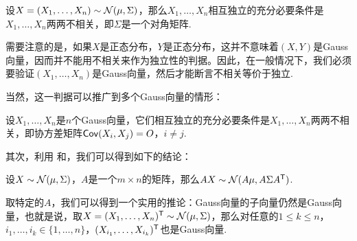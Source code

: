 \begin{proposition}\label{prop:gauss-vector-independence}
设$X=(X_1,\dots,X_n)\sim\mathcal{N}(\mu,\Sigma)$，那么$X_1,\dots,X_n$相互独立的充分必要条件是$X_1,\dots,X_n$两两不相关，即$\Sigma$是一个对角矩阵. 
\end{proposition}

需要注意的是，如果$X$是正态分布，$Y$是正态分布，这并不意味着$(X,Y)$是Gauss向量，因而并不能用不相关来作为独立性的判据。因此，在一般情况下，我们必须要验证$(X_1,\dots,X_n)$是Gauss向量，然后才能断言不相关等价于独立. 

当然，这一判据可以推广到多个Gauss向量的情形：

\begin{proposition}\label{prop:gauss-vector-independence-2}
设$X_1,\dots,X_n$是$n$个Gauss向量，它们相互独立的充分必要条件是$X_1,\dots,X_n$两两不相关，即协方差矩阵$\mathsf{Cov}(X_i,X_j)=O$，$i\neq j$.
\end{proposition}


其次，利用 和，我们可以得到如下的结论：

\begin{proposition}\label{prop:gauss-vector-linear}
设$X\sim\mathcal{N}(\mu,\Sigma)$，$A$是一个$m\times n$的矩阵，那么$AX\sim\mathcal{N}(A\mu,A\Sigma A^{\mathsf{T}})$.
\end{proposition}

取特定的$A$，我们可以得到一个实用的推论：Gauss向量的子向量仍然是Gauss向量，也就是说，取$X=(X_1,\dots,X_n)^{\mathsf{T}}\sim\mathcal{N}(\mu,\Sigma)$，那么对任意的$1\leq k\leq n$，$i_1,\dots,i_k\in\{1,\dots,n\}$，$(X_{i_1},\dots,X_{i_k})^{\mathsf{T}}$也是Gauss向量. 


\endgroup
